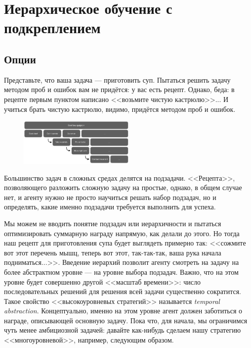 \section{Иерархическое обучение с подкреплением}

\subsection{Опции}

Представьте, что ваша задача --- приготовить суп. Пытаться решить задачу методом проб и ошибок вам не придётся: у вас есть рецепт. Однако, беда: в рецепте первым пунктом написано <<возьмите чистую кастрюлю>>... И учиться брать чистую кастрюлю, видимо, придётся методом проб и ошибок.

\begin{figure}
\vspace{-0.4cm}
\centering
\includegraphics[width=0.5\textwidth]{Images/hierarchy.png}
\vspace{-0.5cm}
\end{figure}

Большинство задач в сложных средах делятся на подзадачи. <<Рецепта>>, позволяющего разложить сложную задачу на простые, однако, в общем случае нет, и агенту нужно не просто научиться решать набор подзадач, но и определять, какие именно подзадачи требуется выполнить для успеха.

Мы можем не вводить понятие подзадач или иерархичности и пытаться оптимизировать суммарную награду напрямую, как делали до этого. Но тогда наш рецепт для приготовления супа будет выглядеть примерно так: <<сожмите вот этот перечень мышц, теперь вот этот, так-так-так, ваша рука начала подниматься...>>. Введение иерархий позволит агенту смотреть на задачу на более абстрактном уровне --- на уровне выбора подзадач. Важно, что на этом уровне будет совершенно другой <<масштаб времени>>: число последовательных решений для решения всей задачи существенно сократится. Такое свойство <<высокоуровневых стратегий>> называется \emph{temporal abstraction}. Концептуально, именно на этом уровне агент должен заботиться о награде, описывающей основную задачу. Пока что, для начала, мы ограничимся чуть менее амбициозной задачей: давайте как-нибудь сделаем нашу стратегию <<многоуровневой>>, например, следующим образом.

